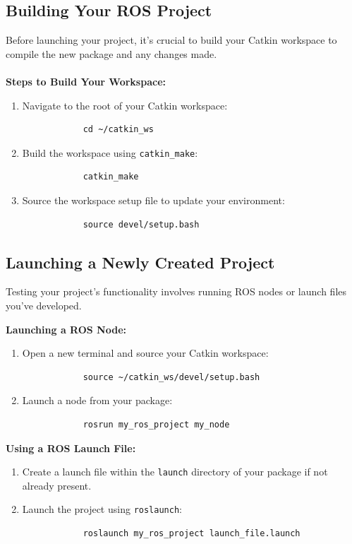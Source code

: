 \documentclass[12pt,a4paper]{article}
\begin{document}
	\subsection{Building Your ROS Project}
	Before launching your project, it's crucial to build your Catkin workspace to compile the new package and any changes made.
	\\\\
	\textbf{Steps to Build Your Workspace:}
	\begin{enumerate}
		\item Navigate to the root of your Catkin workspace:
		\begin{verbatim}
			cd ~/catkin_ws
		\end{verbatim}
		
		\item Build the workspace using \texttt{catkin\_make}:
		\begin{verbatim}
			catkin_make
		\end{verbatim}
		
		\item Source the workspace setup file to update your environment:
		\begin{verbatim}
			source devel/setup.bash
		\end{verbatim}
	\end{enumerate}
	
	\subsection{Launching a Newly Created Project}
	Testing your project's functionality involves running ROS nodes or launch files you've developed.
	
	\textbf{Launching a ROS Node:}
	\begin{enumerate}
		\item Open a new terminal and source your Catkin workspace:
		\begin{verbatim}
			source ~/catkin_ws/devel/setup.bash
		\end{verbatim}
		
		\item Launch a node from your package:
		\begin{verbatim}
			rosrun my_ros_project my_node
		\end{verbatim}
	\end{enumerate}
	
	\textbf{Using a ROS Launch File:}
	\begin{enumerate}
		\item Create a launch file within the \texttt{launch} directory of your package if not already present.
		\item Launch the project using \texttt{roslaunch}:
		\begin{verbatim}
			roslaunch my_ros_project launch_file.launch
		\end{verbatim}
	\end{enumerate}
	
\end{document}
